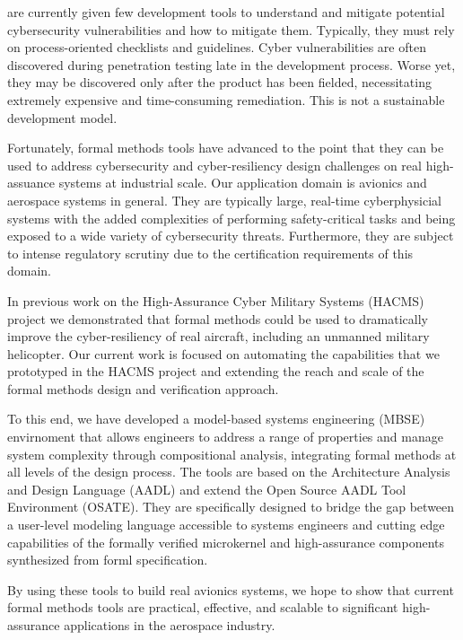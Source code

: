  are currently given few
development tools to understand and mitigate 
potential cybersecurity vulnerabilities and how to  mitigate them.  Typically, they must rely on
process-oriented checklists and guidelines. Cyber vulnerabilities
are often discovered during penetration testing late in the
development process. Worse yet, they may be discovered
only after the product has been fielded, necessitating extremely
expensive and time-consuming remediation. This is not a
sustainable development model.

Fortunately, formal methods tools have advanced to the point that they can 
be used to address cybersecurity and cyber-resiliency design challenges
on real high-assuance systems at industrial scale.  
Our application domain is avionics and aerospace systems in general.  
They are typically large, real-time cyberphysicial systems with the added 
complexities of performing safety-critical tasks and being exposed to 
a wide variety of cybersecurity threats.  Furthermore, they are subject 
to intense regulatory scrutiny due to the certification requirements of this domain. 

In previous work on the High-Assurance Cyber Military Systems (HACMS) project \cite{HACMS}
we demonstrated that formal methods could be used to dramatically improve the 
cyber-resiliency of real aircraft, including an unmanned military helicopter.  Our current
work is focused on automating the capabilities that we prototyped in the HACMS project
and extending the reach and scale of the formal methods design and verification approach.  

To this end, we have developed a model-based systems engineering (MBSE) 
envirnoment that allows engineers to address a range of properties and 
manage system complexity through compositional analysis, integrating formal methods
at all levels of the design process.  The \briefcase tools are based on the 
Architecture Analysis and Design Language (AADL) and extend the Open Source
AADL Tool Environment (OSATE).  They are specifically designed 
to bridge the gap between a user-level modeling language accessible to systems 
engineers and cutting edge capabilities of the formally verified \selFour microkernel
and high-assurance components synthesized from forml specification.  

By using these tools to build real avionics systems, we hope to show 
that current formal methods tools are practical, effective, and scalable to significant 
high-assurance applications in the aerospace industry.  

